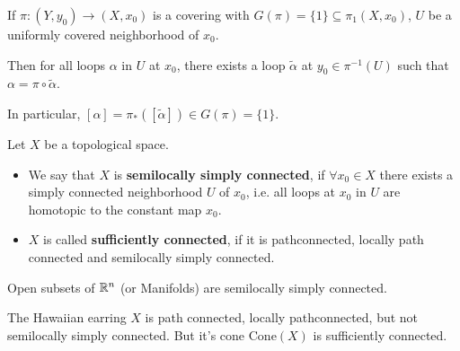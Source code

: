 \begin{rem}[]
  If $\pi:(Y,y_0) \to  (X,x_0)$ is a covering with $G(\pi) = \{1\} \subseteq \pi_1(X,x_0)$, $U$ be a uniformly covered neighborhood of $x_0$.

  Then for all loops $\alpha$ in $U$ at $x_0$, there exists a loop $\tilde{\alpha}$ at $y_0 \in \pi^{-1}(U)$ such that $\alpha = \pi \circ \tilde{\alpha}$.

  In particular, $[\alpha] = \pi_{\ast}([\tilde{\alpha}]) \in G(\pi) = \{1\}$.
\end{rem}


\begin{dfn}[]
Let $X$ be a topological space.
\begin{itemize}
  \item We say that $X$ is \textbf{semilocally simply connected}, if $\forall x_0 \in X$ there exists a simply connected neighborhood $U$ of $x_0$, i.e. all loops at $x_0$ in $U$ are homotopic to the constant map $x_0$.
  \item $X$ is called \textbf{sufficiently connected}, if it is pathconnected, locally path connected and semilocally simply connected.
\end{itemize}
\end{dfn}

\begin{ex}[]
  Open subsets of $\mathbb{R}^{n}$ (or Manifolds) are semilocally simply connected.

  The Hawaiian earring $X$ is path connected, locally pathconnected, but not semilocally simply connected.
  But it's cone $\text{Cone}(X)$ is sufficiently connected.
\end{ex}

